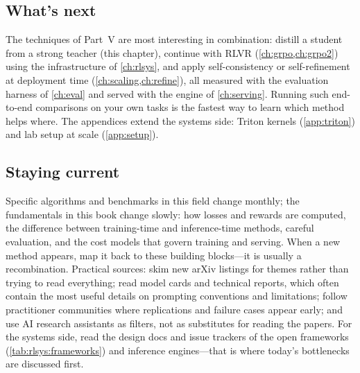 \subsection{What's next}

The techniques of Part~V are most interesting in combination: distill a student from a strong
teacher (this chapter), continue with RLVR (\cref{ch:grpo,ch:grpo2}) using the infrastructure of
\cref{ch:rlsys}, and apply self-consistency or self-refinement at deployment time
(\cref{ch:scaling,ch:refine}), all measured with the evaluation harness of \cref{ch:eval} and served
with the engine of \cref{ch:serving}. Running such end-to-end comparisons on your own tasks is
the fastest way to learn which method helps where. The appendices extend the systems side:
Triton kernels (\cref{app:triton}) and lab setup at scale (\cref{app:setup}).

\subsection{Staying current}

Specific algorithms and benchmarks in this field change monthly; the fundamentals in this book
change slowly: how losses and rewards are computed, the difference between training-time and
inference-time methods, careful evaluation, and the cost models that govern training and
serving. When a new method appears, map it back to these building blocks---it is usually a
recombination. Practical sources: skim new arXiv listings for themes rather than trying to read
everything; read model cards and technical reports, which often contain the most useful details
on prompting conventions and limitations; follow practitioner communities where replications and
failure cases appear early; and use AI research assistants as filters, not as substitutes for
reading the papers. For the systems side, read the design docs and issue trackers of the open
frameworks (\cref{tab:rlsys:frameworks}) and inference engines---that is where today's
bottlenecks are discussed first.


